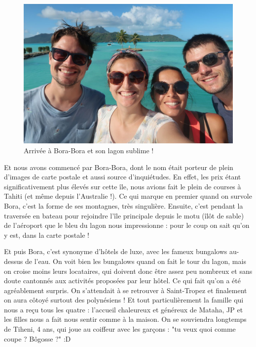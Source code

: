 \begin{figure}
\centering
\includegraphics{images/20180820_boraselfie.JPG}
\caption{Arrivée à Bora-Bora et son lagon sublime !}
\end{figure}

Et nous avons commencé par Bora-Bora, dont le nom était porteur de plein
d'images de carte postale et aussi source d'inquiétudes. En effet, les
prix étant significativement plus élevés sur cette île, nous avions fait
le plein de courses à Tahiti (et même depuis l'Australie !). Ce qui
marque en premier quand on survole Bora, c'est la forme de ses
montagnes, très singulière. Ensuite, c'est pendant la traversée en
bateau pour rejoindre l'île principale depuis le motu (îlôt de sable) de
l'aéroport que le bleu du lagon nous impressionne : pour le coup on sait
qu'on y est, dans la carte postale !

Et puis Bora, c'est synonyme d'hôtels de luxe, avec les fameux bungalows
au-dessus de l'eau. On voit bien les bungalows quand on fait le tour du
lagon, mais on croise moins leurs locataires, qui doivent donc être
assez peu nombreux et sans doute cantonnés aux activités proposées par
leur hôtel. Ce qui fait qu'on a été agréablement surpris. On s'attendait
à se retrouver à Saint-Tropez et finalement on aura côtoyé surtout des
polynésiens ! Et tout particulièrement la famille qui nous a reçu tous
les quatre : l'accueil chaleureux et généreux de Mataha, JP et les
filles nous a fait nous sentir comme à la maison. On se souviendra
longtemps de Tiheni, 4 ans, qui joue au coiffeur avec les garçons : "tu
veux quoi comme coupe ? Bôgosse ?" :D

